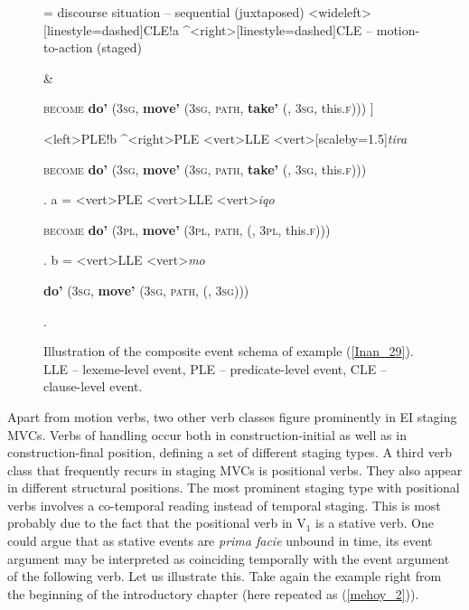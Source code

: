 \begin{sidewaysfigure}
\jtree[xunit=7.5em,yunit=2em]
\! = {discourse situation -- sequential (juxtaposed)}
<wideleft>[linestyle=dashed]{CLE}!a ^<right>[linestyle=dashed]{CLE -- motion-to-action (staged)}{\begin{scriptsize} [ \textbf{do'} (3\textsc{sg}, \textbf{move'} (3\textsc{sg}, \textsc{path}, \textbf{\rnode{D1}{come'}} (\rnode{B1}{e$_2$}, 3\textsc{sg})))\end{scriptsize} \&}
{\begin{scriptsize} \textsc{become} \textbf{do'} (3\textsc{sg}, \textbf{move'} (3\textsc{sg}, \textsc{path}, \textbf{take'} (, 3\textsc{sg}, this.\textsc{f}))) ]\end{scriptsize}}
<left>{PLE}!b ^<right>{PLE}
<vert>{LLE}
<vert>[scaleby=1.5]{\textit{tira}}{\begin{scriptsize} \textsc{become} \textbf{do'} (3\textsc{sg}, \textbf{move'} (3\textsc{sg}, \textsc{path}, \textbf{take'} (, 3\textsc{sg}, this.\textsc{f})))\end{scriptsize}}.
\!a = <vert>{PLE}
<vert>{LLE}
<vert>{\textit{iqo}}
{\begin{scriptsize} \textsc{become} \textbf{do'} (3\textsc{pl}, \textbf{move'} (3\textsc{pl}, \textsc{path}, \textbf{} (, 3\textsc{pl}, this.\textsc{f})))\end{scriptsize}}.
\!b = <vert>{LLE}
<vert>{\textit{mo}}
{\begin{scriptsize} \textbf{do'} (3\textsc{sg}, \textbf{move'} (3\textsc{sg}, \textsc{path}, \textbf{} (, 3\textsc{sg})))\end{scriptsize}}.
\endjtree

\caption[Event schema illustration of example (\ref{Inan_29})]{Illustration of the composite event schema of example (\ref{Inan_29}). LLE -- lexeme-level event, PLE -- predicate-level event, CLE -- clause-level event.}
\label{figure:eventschema_Inan29}
\end{sidewaysfigure}

Apart from motion verbs, two other verb classes figure prominently in EI staging MVCs. Verbs of handling occur both in construction-initial as well as in construction-final position, defining a set of different staging types. A third verb class that frequently recurs in staging MVCs is positional verbs. They also appear in different structural positions. The most prominent staging type with positional verbs involves a co-temporal reading instead of temporal staging. This is most probably due to the fact that the positional verb in V$_1$ is a stative verb. One could argue that as stative events are \textit{prima facie} unbound in time, its event argument may be interpreted as coinciding temporally with the event argument of the following verb. Let us illustrate this. Take again the  example right from the beginning of the introductory chapter (here repeated as (\ref{mehoy_2})).

